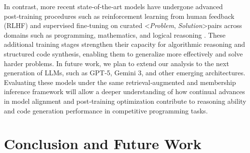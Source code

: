 \documentclass[preprint,12pt]{elsarticle}
\begin{document}
In contrast, more recent state‑of‑the‑art models have undergone advanced post‑training procedures such as reinforcement learning from human feedback (RLHF) and supervised fine‑tuning on curated \textless\textit{Problem}, \textit{Solution}\textgreater pairs across domains such as programming, mathematics, and logical reasoning \cite{r3}. These additional training stages strengthen their capacity for algorithmic reasoning and structured code synthesis, enabling them to generalize more effectively and solve harder problems. In future work, we plan to extend our analysis to the next generation of LLMs, such as GPT‑5, Gemini 3, and other emerging architectures. Evaluating these models under the same retrieval‑augmented and membership inference framework will allow a deeper understanding of how continual advances in model alignment and post‑training optimization contribute to reasoning ability and code generation performance in competitive programming tasks.


\section{Conclusion and Future Work}
\label{sec:conclusion}



\end{document}
